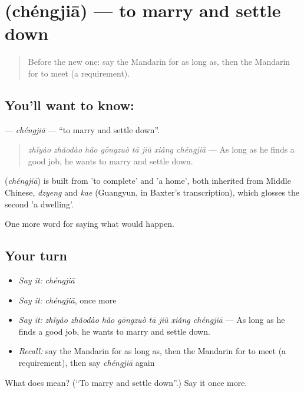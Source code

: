 \section[\texorpdfstring{\zh{成家} (chéngjiā)}{成家 (chéngjiā)}]{ (chéngjiā) — to marry and settle down}

\label{lesson:ZH-C399-chengjia}



\begin{quote}
Before the new one: say the Mandarin for as long as, then the Mandarin for to meet (a requirement).
\end{quote}

\subsection*{You'll want to know: }
\textbf{} — \emph{chéngjiā} — \textquotedblleft{}to marry and settle down\textquotedblright{}.

\begin{quote}
\textbf{} \emph{zhǐyào zhǎodào hǎo gōngzuò tā jiù xiǎng chéngjiā} — As long as he finds a good job, he wants to marry and settle down.
\end{quote}

\begin{cousinweb}
\textbf{} (\emph{chéngjiā}) is built from  'to complete' and  'a home', both inherited from Middle Chinese, \emph{dzyeng} and \emph{kae} (Guangyun, in Baxter's transcription), which glosses the second 'a dwelling'.
\end{cousinweb}

\begin{grammarlens}[title={What you've built}]
One more word for saying what would happen.
\end{grammarlens}

\subsection*{Your turn}
\begin{itemize}
\raggedright
  \item \emph{Say it:} \emph{chéngjiā}
  \item \emph{Say it:} \emph{chéngjiā}, once more
  \item \emph{Say it:} \emph{zhǐyào zhǎodào hǎo gōngzuò tā jiù xiǎng chéngjiā} — As long as he finds a good job, he wants to marry and settle down.
  \item \emph{Recall:} say the Mandarin for as long as, then the Mandarin for to meet (a requirement), then say \emph{chéngjiā} again
\end{itemize}

\begin{tcolorbox}[breakable,colback=teal!4,colframe=teal!35!black,title={Before you move on}]
What does  mean? (\textquotedblleft{}To marry and settle down\textquotedblright{}.) Say it once more.
\end{tcolorbox}
